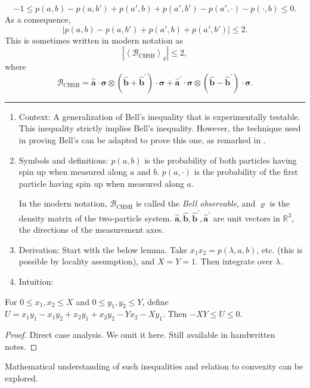 \begin{tcolorbox}[breakable,colback=cyan!10,title=Bell-CHSH Inequality]
    \[
    -1 \leq p(a, b) - p(a, b') + p(a', b) + p(a', b') - p(a', \cdot) - p(\cdot, b) \leq 0
    .\]
    As a consequence,
    \[
    |p(a, b) - p(a, b') + p(a', b) + p(a', b')| \leq 2
    .\]
    This is sometimes written in modern notation as
    \[
\left|\left\langle\mathcal{B}_{\mathrm{CHSH}}\right\rangle_{\varrho}\right| \leq 2,
\]
    where
    \[
\mathcal{B}_{\mathrm{CHSH}}=\hat{\boldsymbol{a}} \cdot \boldsymbol{\sigma} \otimes\left(\hat{\boldsymbol{b}}+\hat{\boldsymbol{b}}^{\prime}\right) \cdot \boldsymbol{\sigma}+\hat{\boldsymbol{a}}^{\prime} \cdot \boldsymbol{\sigma} \otimes\left(\hat{\boldsymbol{b}}-\hat{\boldsymbol{b}}^{\prime}\right) \cdot \boldsymbol{\sigma}.
\]
    \rule{\linewidth}{0.1em}
    \begin{enumerate}[leftmargin=!,labelindent=!,itemindent=-15pt]
        \item Context: A generalization of Bell's inequality that is experimentally testable. This inequality strictly implies Bell's inequality. However, the technique used in proving Bell's can be adapted to prove this one, as remarked in \autocite[eqn.~B7]{clauserProposedExperiment1969}.
        \item Symbols and definitions: $p(a, b)$ is the probability of both particles having spin up when measured along $a$ and $b$. $p(a, \cdot)$ is the probability of the first particle having spin up when measured along $a$. 
        
        In the modern notation, $\mathcal{B}_{\mathrm{CHSH}}$ is called the \textit{Bell observable}, and $\varrho$ is the density matrix of the two-particle system. $\hat{\boldsymbol{a}}, \hat{\boldsymbol{b}}, \hat{\boldsymbol{b}}^{\prime}, \hat{\boldsymbol{a}}^{\prime}$ are unit vectors in $\mathbb{R}^3$, the directions of the measurement axes. 
        \item Derivation: Start with the below lemma. Take $x_1 x_2 = p(\lambda, a, b)$, etc. (this is possible by locality assumption), and $X = Y = 1$. Then integrate over $\lambda$.
        \item Intuition:
    \end{enumerate}
\end{tcolorbox}
\begin{lemma}
    For $0 \le x_1, x_2 \le X$ and $0 \le y_1, y_2 \le Y$, define $U = x_1 y_1 - x_1 y_2 + x_2 y_1 + x_2 y_2 - Y x_2 - X y_1$. Then $-X Y \le U \le 0$.
\end{lemma}
\begin{proof}
    Direct case analysis. We omit it here. Still available in handwritten notes. 
\end{proof}
\followup Mathematical understanding of such inequalities and relation to convexity can be explored.


